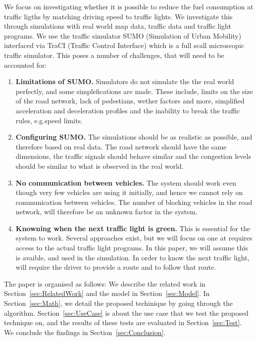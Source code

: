 We focus on investigating whether it is possible to reduce the fuel consumption at traffic ligths by matching driving speed to traffic lights. 
We investigate this through simulations with real world map data, traffic data and traffic light programs. %
We use the traffic simulator SUMO (Simulation of Urban Mobility)\cite{sumo} interfaced via TraCI (Traffic Control Interface)\cite{traci} which is a full scall microscopic traffic simulator.
This poses a number of challenges, that will need to be accounted for:
\begin{enumerate} %
\item \textbf{Limitations of SUMO.}
Simulators do not simulate the the real world perfectly, and some simplefications are made. 
These include, limits on the size of the road network, lack of pedestians, wether factors and more, simplified acceleration and deceleration profiles and the inability to break the traffic rules, e.g.speed limits.
\item \textbf{Configuring SUMO.}
The simulations should be as realistic as possible, and therefore based on real data. 
The road network should have the same dimensions, the traffic signals should behave similar and the congestion levels should be similar to what is observed in the real world.
\item \textbf{No communication between vehicles.} 
The system should work even though very few vehicles are using it initially, and hence we cannot rely on communication between vehicles. 
The number of blocking vehicles in the road network, will therefore be an unknown factor in the system.
\item \textbf{Knowning when the next traffic light is green.}
This is essential for the system to work.
Several approaches exist, but we will focus on one at requires access to the actual traffic light programs.
In this paper, we will assume this is avaible, and used in the simulation. 
In order to know the next traffic light, will require the driver to provide a route and to follow that route. 
\end{enumerate}


The paper is organised as follows: 
We describe the related work in Section~\ref{sec:RelatedWork} and the model in Section~\ref{sec:Model}. 
In Section~\ref{sec:Math}, we detail the proposed techinique by going through the algorithm.
Section~\ref{sec:UseCase} is about the use case that we test the proposed technique on, and the results of these tests are evaluated in Section~\ref{sec:Test}. 
We conclude the findings in Section~\ref{sec:Conclusion}.





